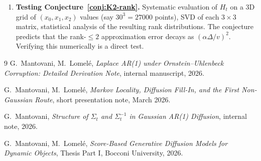 \documentclass[11pt,a4paper,openany]{book}
\theoremstyle{plainserif}
\theoremstyle{definition}
\theoremstyle{remarkstyle}
\begin{document}
\begin{enumerate}[leftmargin=2em]
\item \textbf{Testing Conjecture~\ref{conj:K2-rank}.}
Systematic evaluation of $H_t$ on a 3D grid of $(x_0, x_1, x_2)$ values
(say $30^3 = 27000$ points), SVD of each $3\times 3$ matrix, statistical
analysis of the resulting rank distributions. The conjecture predicts
that the rank-$\leq 2$ approximation error decays as $(\alpha\Delta/v)^2$.
Verifying this numerically is a direct test.
\end{enumerate}

\begin{thebibliography}{9}
G.~Mantovani, M.~Lomel\'e,
\emph{Laplace AR(1) under Ornstein--Uhlenbeck Corruption: Detailed Derivation Note},
internal manuscript, 2026.

G.~Mantovani, M.~Lomel\'e,
\emph{Markov Locality, Diffusion Fill-In, and the First Non-Gaussian Route},
short presentation note, March 2026.

G.~Mantovani,
\emph{Structure of $\Sigma_t$ and $\Sigma_t^{-1}$ in Gaussian AR(1) Diffusion},
internal note, 2026.

G.~Mantovani, M.~Lomel\'e,
\emph{Score-Based Generative Diffusion Models for Dynamic Objects},
Thesis Part I, Bocconi University, 2026.
\end{thebibliography}
\end{document}
